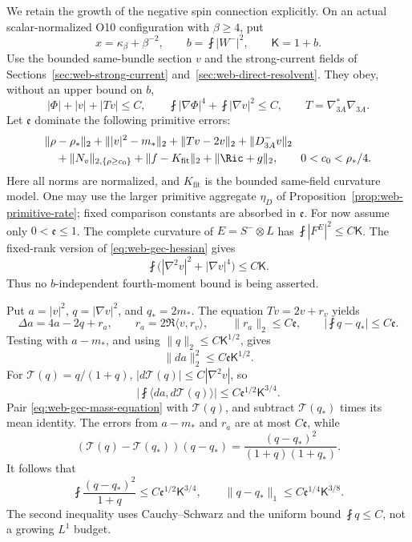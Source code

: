 We retain the growth of the negative spin connection explicitly.  On an
actual scalar-normalized O10 configuration with \(\beta\ge4\), put
\[
 x=\kappa_\beta+\beta^{-2},\qquad
 b=\fint|W^-|^2,\qquad \mathsf K=1+b.
\]
Use the bounded same-bundle section \(v\) and the strong-current fields
of Sections~\ref{sec:web-strong-current} and~\ref{sec:web-direct-resolvent}.
They obey, without an upper bound on \(b\),
\[
 |\Phi|+|v|+|Tv|\le C,\qquad
 \fint|\nabla\Phi|^4+\fint|\nabla v|^2\le C,
 \qquad T=\nabla_{3A}^*\nabla_{3A}.
\]
Let \(\mathfrak e\) dominate the following primitive errors:
\begin{equation}
 \begin{split}
 &\|\rho-\rho_*\|_2+\||v|^2-m_*\|_2+\|Tv-2v\|_2
       +\|D^-_{3A}v\|_2\\
 &\quad+\|N_v\|_{2,\{\rho\ge c_0\}}
       +\|f-K_{\mathrm{fit}}\|_2+\|\Ric+g\|_2,
 \qquad 0<c_0<\rho_*/4.
 \end{split}
 \label{eq:web-gec-primitive-errors}
\end{equation}
Here all norms are normalized, and \(K_{\mathrm{fit}}\) is the bounded
same-field curvature model.  One may use the larger primitive aggregate
\(\eta_D\) of Proposition~\ref{prop:web-primitive-rate}; fixed comparison
constants are absorbed in \(\mathfrak e\).  For now assume only
\(0<\mathfrak e\le1\).  The complete curvature of \(E=S^-\otimes L\)
has \(\fint|F^E|^2\le C\mathsf K\).  The fixed-rank version of
\eqref{eq:web-gec-hessian} gives
\begin{equation}
 \fint\bigl(|\nabla^2v|^2+|\nabla v|^4\bigr)\le C\mathsf K.
 \label{eq:web-gec-growing-hessian}
\end{equation}
Thus no \(b\)-independent fourth-moment bound is being asserted.

Put \(a=|v|^2\), \(q=|\nabla v|^2\), and \(q_*=2m_*\).
The equation \(Tv=2v+r_v\) yields
\begin{equation}
 \Delta a=4a-2q+r_a,\qquad
 r_a=2\Re\langle v,r_v\rangle,\qquad
 \|r_a\|_2\le C\mathfrak e,\qquad
 \left|\fint q-q_*\right|\le C\mathfrak e.
 \label{eq:web-gec-mass-equation}
\end{equation}
Testing with \(a-m_*\), and using \(\|q\|_2\le C\mathsf K^{1/2}\),
gives
\begin{equation}
 \|da\|_2^2\le C\mathfrak e\mathsf K^{1/2}.
 \label{eq:web-gec-radial}
\end{equation}
For \(\mathcal T(q)=q/(1+q)\),
\(|d\mathcal T(q)|\le C|\nabla^2v|\), so
\[
 \left|\fint\langle da,d\mathcal T(q)\rangle\right|
       \le C\mathfrak e^{1/2}\mathsf K^{3/4}.
\]
Pair \eqref{eq:web-gec-mass-equation} with \(\mathcal T(q)\), and
subtract \(\mathcal T(q_*)\) times its mean identity.  The errors from
\(a-m_*\) and \(r_a\) are at most \(C\mathfrak e\), while
\[
 (\mathcal T(q)-\mathcal T(q_*))(q-q_*)
       =\frac{(q-q_*)^2}{(1+q)(1+q_*)}.
\]
It follows that
\begin{equation}
 \fint\frac{(q-q_*)^2}{1+q}
       \le C\mathfrak e^{1/2}\mathsf K^{3/4},\qquad
 \|q-q_*\|_1\le C\mathfrak e^{1/4}\mathsf K^{3/8}.
 \label{eq:web-gec-covariance}
\end{equation}
The second inequality uses Cauchy--Schwarz and the uniform bound
\(\fint q\le C\), not a growing \(L^1\) budget.

